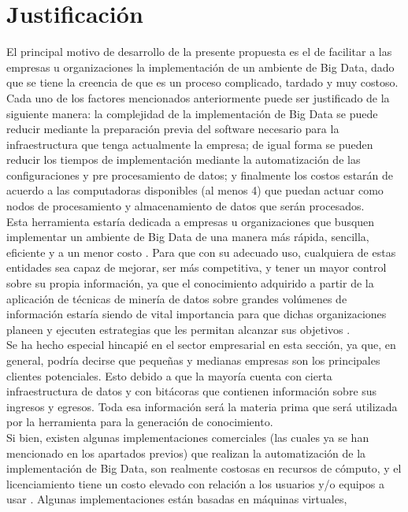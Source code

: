\section{Justificación}
El principal motivo de desarrollo de la presente propuesta es el de facilitar a las empresas u organizaciones la implementación de
un ambiente de Big Data, dado que se tiene la creencia de que es un proceso complicado, tardado y muy costoso. Cada uno de los
factores mencionados anteriormente puede ser justificado de la siguiente manera: la complejidad de la implementación de Big Data
se puede reducir mediante la preparación previa del software necesario para la infraestructura que tenga actualmente la empresa; de
igual forma se pueden reducir los tiempos de implementación mediante la automatización de las configuraciones y pre
procesamiento de datos; y finalmente los costos estarán de acuerdo a las computadoras disponibles (al menos 4) que puedan actuar
como nodos de procesamiento y almacenamiento de datos que serán procesados.
\\
Esta herramienta estaría dedicada a empresas u organizaciones que busquen implementar un ambiente de Big Data de una manera
más rápida, sencilla, eficiente y a un menor costo \cite{refi8}. Para que con su adecuado uso, cualquiera de estas entidades sea capaz de
mejorar, ser más competitiva, y tener un mayor control sobre su propia información, ya que el conocimiento adquirido a partir de
la aplicación de técnicas de minería de datos sobre grandes volúmenes de información estaría siendo de vital importancia para que
dichas organizaciones planeen y ejecuten estrategias que les permitan alcanzar sus objetivos \cite{refi7}.
\\
Se ha hecho especial hincapié en el sector empresarial en esta sección, ya que, en general, podría decirse que pequeñas y medianas
empresas son los principales clientes potenciales. Esto debido a que la mayoría cuenta con cierta infraestructura de datos y con
bitácoras que contienen información sobre sus ingresos y egresos. Toda esa información será la materia prima que será utilizada
por la herramienta para la generación de conocimiento.
\\
Si bien, existen algunas implementaciones comerciales (las cuales ya se han mencionado en los apartados previos) que realizan la
automatización de la implementación de Big Data, son realmente costosas en recursos de cómputo, y el licenciamiento tiene un
costo elevado con relación a los usuarios y/o equipos a usar \cite{refi9}. Algunas implementaciones están basadas en máquinas virtuales,
